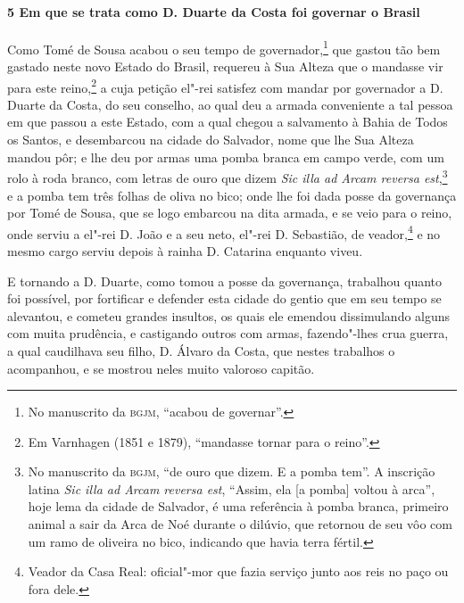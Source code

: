 \begin{linenumbers}
\paragraph{5 Em que se trata como D. Duarte da Costa foi governar o Brasil} \quad
Como Tomé de Sousa acabou o seu tempo de governador,\footnote{ No manuscrito da
\textsc{bgjm}, ``acabou de governar''.} que gastou tão bem gastado neste novo Estado do
Brasil, requereu à Sua Alteza que o mandasse vir para este reino,\footnote{ Em Varnhagen
(1851 e 1879), ``mandasse tornar para o reino''.} a cuja petição el"-rei satisfez com
mandar por governador a D. Duarte da Costa, do seu conselho, ao qual deu a armada
conveniente a tal pessoa em que passou a este Estado, com a qual chegou a salvamento à
Bahia de Todos os Santos, e desembarcou na cidade do Salvador, nome que lhe Sua Alteza
mandou pôr; e lhe deu por armas uma pomba branca em campo verde, com um rolo à roda
branco, com letras de ouro que dizem \textit{Sic illa ad Arcam reversa est},\footnote{ No
manuscrito da \textsc{bgjm}, ``de ouro que dizem. E a pomba tem''. A inscrição latina
\textit{Sic illa ad Arcam reversa est}, ``Assim, ela [a pomba] voltou à arca'', hoje lema
da cidade de Salvador, é uma referência à pomba branca, primeiro animal a sair da Arca de
Noé durante o dilúvio, que retornou de seu vôo com um ramo de oliveira no bico, indicando
que havia terra fértil. } e a pomba tem três folhas de oliva no bico; onde lhe foi dada
posse da governança por Tomé de Sousa, que se logo embarcou na dita armada, e se veio para
o reino, onde serviu a el"-rei D. João e a seu neto, el"-rei D. Sebastião, de
veador,\footnote{ Veador da Casa Real: oficial"-mor que fazia serviço junto aos reis no paço
ou fora dele.} e no mesmo cargo serviu depois à rainha D. Catarina enquanto viveu.

E tornando a D. Duarte, como tomou a posse da governança, trabalhou quanto foi possível,
por fortificar e defender esta cidade do gentio que em seu tempo se alevantou, e cometeu
grandes insultos, os quais ele emendou dissimulando alguns com muita prudência, e
castigando outros com armas, fazendo"-lhes crua guerra, a qual caudilhava seu filho, D.
Álvaro da Costa, que nestes trabalhos o acompanhou, e se mostrou neles muito valoroso
capitão.


\end{linenumbers}

